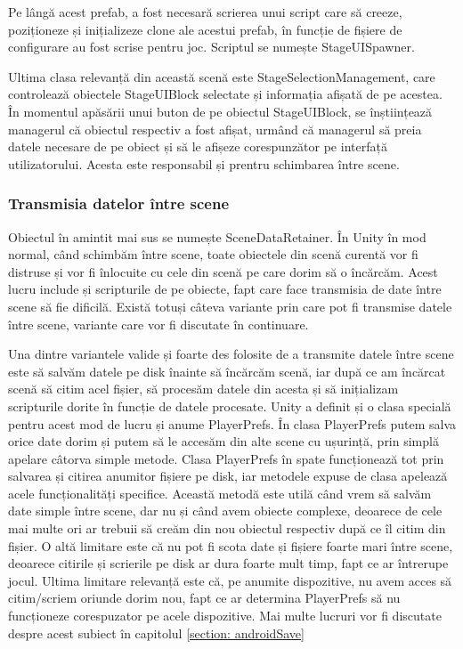 \documentclass[12pt, a4paper]{article}
\begin{document}
	Pe lângă acest prefab, a fost necesară scrierea unui script care să creeze, poziționeze și inițializeze clone ale acestui prefab, în funcție de fișiere de configurare au fost scrise pentru joc. Scriptul se numește StageUISpawner.
	\newline
	
	Ultima clasa relevanță din această scenă este StageSelectionManagement, care controlează obiectele StageUIBlock selectate și informația afișată de pe acestea. În momentul apăsării unui buton de pe obiectul StageUIBlock, se înștiințează managerul că obiectul respectiv a fost afișat, urmând că managerul să preia datele necesare de pe obiect și să le afișeze corespunzător pe interfață utilizatorului. Acesta este responsabil și prentru schimbarea între scene.
	
	
	
	
	
	\subsubsection{Transmisia datelor între scene}
	\label{section: dataBetweenScenes}
	
	Obiectul în amintit mai sus se numește SceneDataRetainer. În Unity în mod normal, când schimbăm între scene, toate obiectele din scenă curentă vor fi distruse și vor fi înlocuite cu cele din scenă pe care dorim să o încărcăm. Acest lucru include și scripturile de pe obiecte, fapt care face transmisia de date între scene să fie dificilă. Există totuși câteva variante prin care pot fi transmise datele între scene, variante care vor fi discutate în continuare.
	\newline
	
	Una dintre variantele valide și foarte des folosite de a transmite datele între scene este să salvăm datele pe disk înainte să încărcăm scenă, iar după ce am încărcat scenă să citim acel fișier, să procesăm datele din acesta și să inițializam scripturile dorite în funcție de datele procesate. Unity a definit și o clasa specială pentru acest mod de lucru și anume PlayerPrefs. În clasa PlayerPrefs putem salva orice date dorim și putem să le accesăm din alte scene cu ușurință, prin simplă apelare câtorva simple metode. Clasa PlayerPrefs în spate funcționează tot prin salvarea și citirea anumitor fișiere pe disk, iar metodele expuse de clasa apelează acele funcționalități specifice. Această metodă este utilă când vrem să salvăm date simple între scene, dar nu și când avem obiecte complexe, deoarece de cele mai multe ori ar trebuii să creăm din nou obiectul respectiv după ce îl citim din fișier. O altă limitare este că nu pot fi scota date și fișiere foarte mari între scene, deoarece citirile și scrierile pe disk ar dura foarte mult timp, fapt ce ar întrerupe jocul. Ultima limitare relevanță este că, pe anumite dispozitive, nu avem acces să citim/scriem oriunde dorim nou, fapt ce ar determina PlayerPrefs să nu funcționeze corespuzator pe acele dispozitive. Mai multe lucruri vor fi discutate despre acest subiect în capitolul \ref{section: androidSave}
	\newline
	
\end{document}
